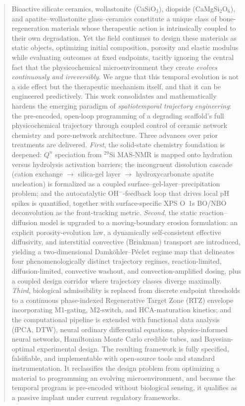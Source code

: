 \documentclass[11pt]{article}
\begin{document}
\begin{abstract}
\noindent
Bioactive silicate ceramics, wollastonite (CaSiO$_3$), diopside (CaMgSi$_2$O$_6$), and apatite--wollastonite glass--ceramics constitute a unique class of bone-regeneration materials whose therapeutic action is intrinsically coupled to their own degradation. Yet the field continues to design these materials as static objects, optimizing initial composition, porosity and elastic modulus while evaluating outcomes at fixed endpoints, tacitly ignoring the central fact that the physicochemical microenvironment they create \emph{evolves continuously and irreversibly}. We argue that this temporal evolution is not a side effect but the therapeutic mechanism itself, and that it can be engineered predictively. This work consolidates and mathematically hardens the emerging paradigm of \emph{spatiotemporal trajectory engineering}: the pre-encoded, open-loop programming of a degrading scaffold's full physicochemical trajectory through coupled control of ceramic network chemistry and pore-network architecture. Three advances over prior treatments are delivered. \emph{First}, the solid-state chemistry foundation is deepened: $Q^n$ speciation from $^{29}$Si MAS-NMR is mapped onto hydration versus hydrolysis activation barriers; the incongruent dissolution cascade (cation exchange $\rightarrow$ silica-gel layer $\rightarrow$ hydroxycarbonate apatite nucleation) is formalized as a coupled surface--gel-layer--precipitation problem; and the autocatalytic OH$^-$-feedback loop that drives local pH spikes is quantified, together with surface-specific XPS O~1s BO/NBO deconvolution as the front-tracking metric. \emph{Second}, the static reaction--diffusion model is upgraded to a moving-boundary erosion formulation: an explicit porosity-evolution law, a dynamically self-consistent effective diffusivity, and interstitial convective (Brinkman) transport are introduced, yielding a two-dimensional Damk\"ohler--P\'eclet regime map that delineates four phenomenologically distinct trajectory regimes, reaction-limited, diffusion-limited, convective washout, and convection-amplified dosing, plus a coupled design corridor where trajectory classes diverge maximally. \emph{Third}, biological admissibility is replaced from discrete endpoint thresholds to a continuous phase-indexed Regenerative Target Zone (RTZ) envelope incorporating M1-gating, M2-switch, and HCA-maturation kinetics; and the computational pipeline is extended with functional data analysis (fPCA, DTW), neural ordinary differential equations, physics-informed neural networks, Hamiltonian Monte Carlo credible tubes, and Bayesian-optimal experimental design. The resulting framework is fully specified, falsifiable, and implementable with open-source tools and standard instrumentation. It reclassifies the design problem from optimizing a material to programming an evolving microenvironment, and because the temporal program is pre-encoded without biological sensing, it qualifies as a passive implant under current regulatory frameworks.
\end{abstract}
\end{document}
